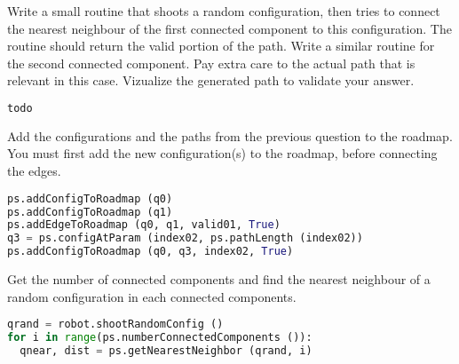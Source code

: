 \documentclass[10pt]{exam}
\begin{document}
\begin{questions}
\question Write a small routine that shoots a random configuration, then tries to connect the nearest neighbour of the first connected component to this configuration.
The routine should return the valid portion of the path. Write a similar routine for the second connected component. Pay extra care to the actual
path that is relevant in this case. Vizualize the generated path to validate your answer.
\begin{solutionorlines}
\begin{lstlisting}[language=python]
todo
\end{lstlisting}
\end{solutionorlines}

\question Add the configurations and the paths from the previous question to the roadmap. You must first add the new configuration(s) to the roadmap, before
connecting the edges.
\begin{solutionorlines}
\begin{lstlisting}[language=python]
ps.addConfigToRoadmap (q0)
ps.addConfigToRoadmap (q1)
ps.addEdgeToRoadmap (q0, q1, valid01, True)
q3 = ps.configAtParam (index02, ps.pathLength (index02))
ps.addConfigToRoadmap (q0, q3, index02, True)
\end{lstlisting}
\end{solutionorlines}

\question Get the number of connected components and find the nearest neighbour of a random configuration in each connected components.
\begin{solutionorlines}
\begin{lstlisting}[language=python]
qrand = robot.shootRandomConfig ()
for i in range(ps.numberConnectedComponents ()):
  qnear, dist = ps.getNearestNeighbor (qrand, i)
\end{lstlisting}
\end{solutionorlines}


\end{questions}
\end{document}
